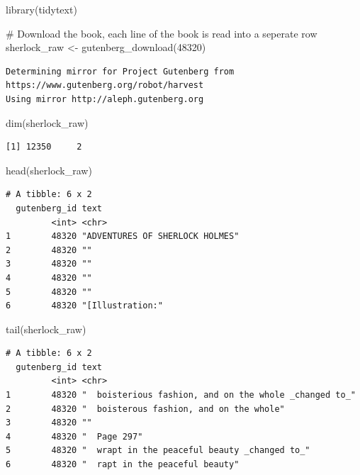 \documentclass[
  letterpaper,
  DIV=11,
  numbers=noendperiod]{scrreprt}
\newenvironment{Shaded}{\begin{snugshade}}{\end{snugshade}}
\newcommand{\CommentTok}[1]{\textcolor[rgb]{0.37,0.37,0.37}{#1}}
\newcommand{\DecValTok}[1]{\textcolor[rgb]{0.68,0.00,0.00}{#1}}
\newcommand{\FunctionTok}[1]{\textcolor[rgb]{0.28,0.35,0.67}{#1}}
\newcommand{\NormalTok}[1]{\textcolor[rgb]{0.00,0.23,0.31}{#1}}
\newcommand{\OtherTok}[1]{\textcolor[rgb]{0.00,0.23,0.31}{#1}}
\begin{document}
\begin{Shaded}
\begin{Highlighting}[]
\FunctionTok{library}\NormalTok{(tidytext)}

\CommentTok{\# Download the book, each line of the book is read into a seperate row}
\NormalTok{sherlock\_raw }\OtherTok{\textless{}{-}} \FunctionTok{gutenberg\_download}\NormalTok{(}\DecValTok{48320}\NormalTok{)}
\end{Highlighting}
\end{Shaded}

\begin{verbatim}
Determining mirror for Project Gutenberg from https://www.gutenberg.org/robot/harvest
Using mirror http://aleph.gutenberg.org
\end{verbatim}

\begin{Shaded}
\begin{Highlighting}[]
\FunctionTok{dim}\NormalTok{(sherlock\_raw)}
\end{Highlighting}
\end{Shaded}

\begin{verbatim}
[1] 12350     2
\end{verbatim}

\begin{Shaded}
\begin{Highlighting}[]
\FunctionTok{head}\NormalTok{(sherlock\_raw)}
\end{Highlighting}
\end{Shaded}

\begin{verbatim}
# A tibble: 6 x 2
  gutenberg_id text                           
         <int> <chr>                          
1        48320 "ADVENTURES OF SHERLOCK HOLMES"
2        48320 ""                             
3        48320 ""                             
4        48320 ""                             
5        48320 ""                             
6        48320 "[Illustration:"               
\end{verbatim}

\begin{Shaded}
\begin{Highlighting}[]
\FunctionTok{tail}\NormalTok{(sherlock\_raw)}
\end{Highlighting}
\end{Shaded}

\begin{verbatim}
# A tibble: 6 x 2
  gutenberg_id text                                                  
         <int> <chr>                                                 
1        48320 "  boisterious fashion, and on the whole _changed to_"
2        48320 "  boisterous fashion, and on the whole"              
3        48320 ""                                                    
4        48320 "  Page 297"                                          
5        48320 "  wrapt in the peaceful beauty _changed to_"         
6        48320 "  rapt in the peaceful beauty"                       
\end{verbatim}
\end{document}
